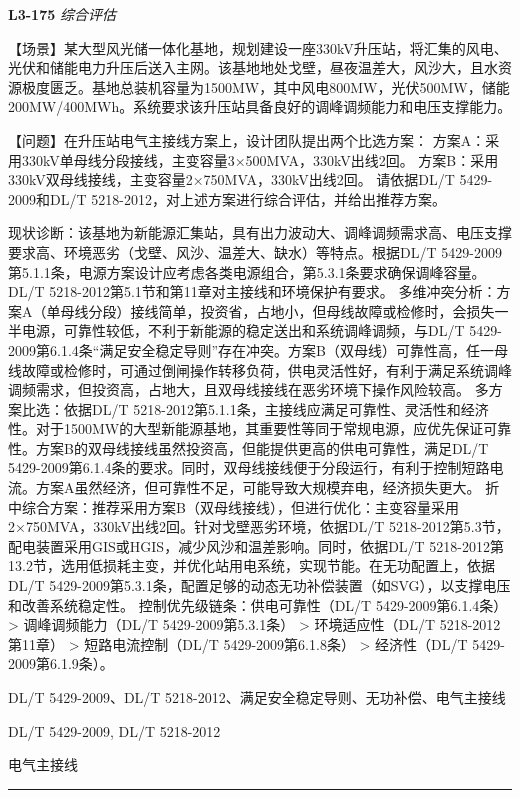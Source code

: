 \documentclass[12pt,a4paper]{ctexart}
\begin{document}
\noindent\textbf{L3-175} \hfill \textit{综合评估}
\begin{description}[leftmargin=1.5em,style=nextline,font=\normalfont]
  \item[Q:] 【场景】某大型风光储一体化基地，规划建设一座330kV升压站，将汇集的风电、光伏和储能电力升压后送入主网。该基地地处戈壁，昼夜温差大，风沙大，且水资源极度匮乏。基地总装机容量为1500MW，其中风电800MW，光伏500MW，储能200MW/400MWh。系统要求该升压站具备良好的调峰调频能力和电压支撑能力。

【问题】在升压站电气主接线方案上，设计团队提出两个比选方案：
方案A：采用330kV单母线分段接线，主变容量3×500MVA，330kV出线2回。
方案B：采用330kV双母线接线，主变容量2×750MVA，330kV出线2回。
请依据DL/T 5429-2009和DL/T 5218-2012，对上述方案进行综合评估，并给出推荐方案。
  \item[A:] 现状诊断：该基地为新能源汇集站，具有出力波动大、调峰调频需求高、电压支撑要求高、环境恶劣（戈壁、风沙、温差大、缺水）等特点。根据DL/T 5429-2009第5.1.1条，电源方案设计应考虑各类电源组合，第5.3.1条要求确保调峰容量。DL/T 5218-2012第5.1节和第11章对主接线和环境保护有要求。
多维冲突分析：方案A（单母线分段）接线简单，投资省，占地小，但母线故障或检修时，会损失一半电源，可靠性较低，不利于新能源的稳定送出和系统调峰调频，与DL/T 5429-2009第6.1.4条“满足安全稳定导则”存在冲突。方案B（双母线）可靠性高，任一母线故障或检修时，可通过倒闸操作转移负荷，供电灵活性好，有利于满足系统调峰调频需求，但投资高，占地大，且双母线接线在恶劣环境下操作风险较高。
多方案比选：依据DL/T 5218-2012第5.1.1条，主接线应满足可靠性、灵活性和经济性。对于1500MW的大型新能源基地，其重要性等同于常规电源，应优先保证可靠性。方案B的双母线接线虽然投资高，但能提供更高的供电可靠性，满足DL/T 5429-2009第6.1.4条的要求。同时，双母线接线便于分段运行，有利于控制短路电流。方案A虽然经济，但可靠性不足，可能导致大规模弃电，经济损失更大。
折中综合方案：推荐采用方案B（双母线接线），但进行优化：主变容量采用2×750MVA，330kV出线2回。针对戈壁恶劣环境，依据DL/T 5218-2012第5.3节，配电装置采用GIS或HGIS，减少风沙和温差影响。同时，依据DL/T 5218-2012第13.2节，选用低损耗主变，并优化站用电系统，实现节能。在无功配置上，依据DL/T 5429-2009第5.3.1条，配置足够的动态无功补偿装置（如SVG），以支撑电压和改善系统稳定性。
控制优先级链条：供电可靠性（DL/T 5429-2009第6.1.4条） \textgreater{} 调峰调频能力（DL/T 5429-2009第5.3.1条） \textgreater{} 环境适应性（DL/T 5218-2012第11章） \textgreater{} 短路电流控制（DL/T 5429-2009第6.1.8条） \textgreater{} 经济性（DL/T 5429-2009第6.1.9条）。
  \item[KW:] DL/T 5429-2009、DL/T 5218-2012、满足安全稳定导则、无功补偿、电气主接线
  \item[Std:] DL/T 5429-2009, DL/T 5218-2012
  \item[Topic:] 电气主接线
\end{description}
\vspace{4pt}
\hrule\vspace{6pt}
\end{document}

